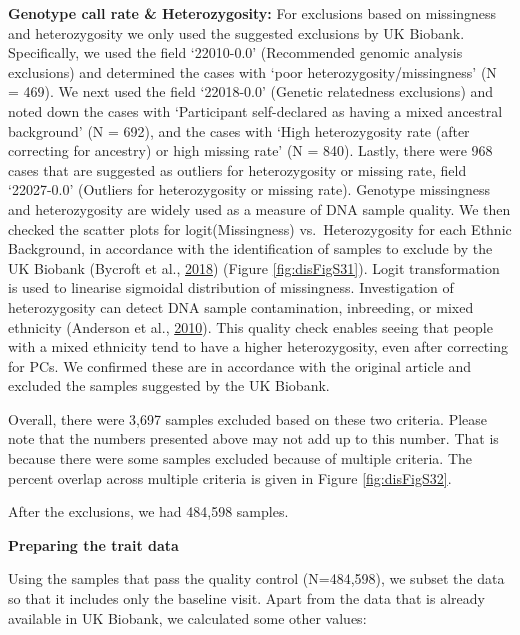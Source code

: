 \documentclass[12pt,twoside]{unicam}
\begin{document}
\textbf{Genotype call rate \& Heterozygosity:} For exclusions based on missingness and heterozygosity we only used the suggested exclusions by UK Biobank. Specifically, we used the field `22010-0.0' (Recommended genomic analysis exclusions) and determined the cases with `poor heterozygosity/missingness' (N = 469). We next used the field `22018-0.0' (Genetic relatedness exclusions) and noted down the cases with `Participant self-declared as having a mixed ancestral background' (N = 692), and the cases with `High heterozygosity rate (after correcting for ancestry) or high missing rate' (N = 840). Lastly, there were 968 cases that are suggested as outliers for heterozygosity or missing rate, field `22027-0.0' (Outliers for heterozygosity or missing rate). Genotype missingness and heterozygosity are widely used as a measure of DNA sample quality. We then checked the scatter plots for logit(Missingness) vs.~Heterozygosity for each Ethnic Background, in accordance with the identification of samples to exclude by the UK Biobank (Bycroft et al., \protect\hyperlink{ref-Bycroft2018}{2018}) (Figure \ref{fig:disFigS31}). Logit transformation is used to linearise sigmoidal distribution of missingness. Investigation of heterozygosity can detect DNA sample contamination, inbreeding, or mixed ethnicity (Anderson et al., \protect\hyperlink{ref-Anderson2010}{2010}). This quality check enables seeing that people with a mixed ethnicity tend to have a higher heterozygosity, even after correcting for PCs. We confirmed these are in accordance with the original article and excluded the samples suggested by the UK Biobank.

Overall, there were 3,697 samples excluded based on these two criteria. Please note that the numbers presented above may not add up to this number. That is because there were some samples excluded because of multiple criteria. The percent overlap across multiple criteria is given in Figure \ref{fig:disFigS32}.

After the exclusions, we had 484,598 samples.

\textbf{Preparing the trait data}

Using the samples that pass the quality control (N=484,598), we subset the data so that it includes only the baseline visit. Apart from the data that is already available in UK Biobank, we calculated some other values:
\end{document}
